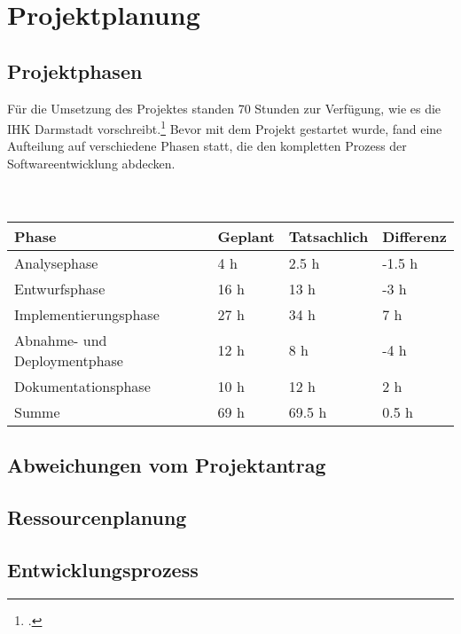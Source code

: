 \section{Projektplanung}

	\subsection{Projektphasen}
	Für die Umsetzung des Projektes standen 70 Stunden zur Verfügung, wie es die IHK Darmstadt vorschreibt.\footcite{2} Bevor mit dem Projekt gestartet wurde, fand eine Aufteilung auf verschiedene Phasen statt,
	die den kompletten Prozess der Softwareentwicklung abdecken.\\ \\ \\
	\begin{tabular}{llll} \toprule
		Phase & Geplant & Tatsachlich & Differenz\\ \bottomrule
		Analysephase & 4 h & 2.5 h & -1.5 h \\
		Entwurfsphase & 16 h & 13 h & -3 h \\
		Implementierungsphase & 27 h & 34 h & 7 h \\
		Abnahme- und Deploymentphase & 12 h & 8 h & -4 h \\
		Dokumentationsphase & 10 h & 12 h & 2 h \\ \bottomrule
		Summe & 69 h & 69.5 h & 0.5 h \\
	\end{tabular}

	\vspace{16pt}
	

	\subsection{Abweichungen vom Projektantrag}
	\subsection{Ressourcenplanung}
	\subsection{Entwicklungsprozess}
